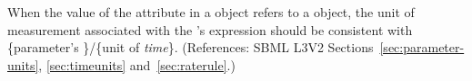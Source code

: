 When the value of the attribute  in a \RateRule object
refers to a \Parameter object, the unit of measurement associated with
the \RateRule's  expression should be consistent with
\{parameter's \}/\{unit of \emph{time}\}. (References: SBML
L3V2 Sections~\ref{sec:parameter-units}, \ref{sec:timeunits}
and~\ref{sec:raterule}.)
